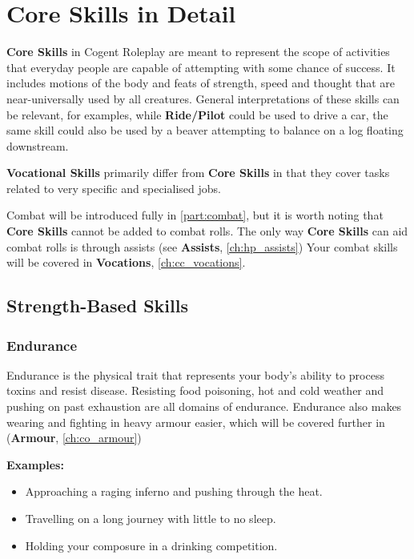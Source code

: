 \section{Core Skills in Detail} \label{sec:core_skills_in_detail}

\textbf{Core Skills} in Cogent Roleplay are meant to represent the scope of activities that everyday people are capable of attempting with some chance of success. It includes motions of the body and feats of strength, speed and thought that are near-universally used by all creatures. General interpretations of these skills can be relevant, for examples, while \textbf{Ride/Pilot} could be used to drive a car, the same skill could also be used by a beaver attempting to balance on a log floating downstream.

\textbf{Vocational Skills} primarily differ from \textbf{Core Skills} in that they cover tasks related to very specific and specialised jobs.

Combat will be introduced fully in \autoref{part:combat}, but it is worth noting that \textbf{Core Skills} cannot be added to combat rolls. The only way \textbf{Core Skills} can aid combat rolls is through assists (see \textbf{Assists}, \autoref{ch:hp_assists}) Your combat skills will be covered in \textbf{Vocations}, \autoref{ch:cc_vocations}.

\subsection{Strength-Based Skills} \label{subsec:strength_based_skills}

\subsubsection{Endurance} \label{subsubsec:endurance}

Endurance is the physical trait that represents your body’s ability to process toxins and resist disease. Resisting food poisoning, hot and cold weather and pushing on past exhaustion are all domains of endurance. Endurance also makes wearing and fighting in heavy armour easier, which will be covered further in (\textbf{Armour}, \autoref{ch:co_armour}) %

\begin{displayquote}
    \textbf{Examples:}
    \begin{itemize}
        \item Approaching a raging inferno and pushing through the heat.
        \item Travelling on a long journey with little to no sleep.
        \item Holding your composure in a drinking competition.
    \end{itemize}
\end{displayquote}

